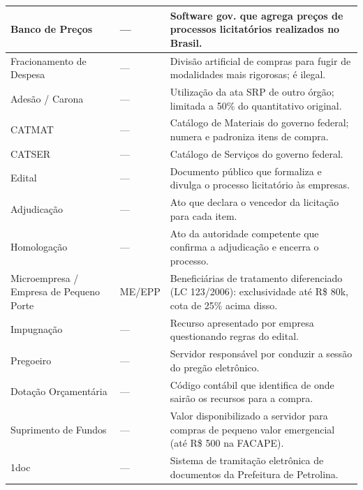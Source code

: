 \documentclass[a4paper,12pt]{article}
\begin{document}
\begin{longtable}{@{} p{4.5cm} p{1.8cm} p{8.5cm} @{}}
Banco de Preços & --- & Software gov. que agrega preços de processos licitatórios realizados no Brasil. \\ \midrule
Fracionamento de Despesa & --- & Divisão artificial de compras para fugir de modalidades mais rigorosas; é ilegal. \\ \midrule
Adesão / Carona & --- & Utilização da ata SRP de outro órgão; limitada a 50\% do quantitativo original. \\ \midrule
CATMAT & --- & Catálogo de Materiais do governo federal; numera e padroniza itens de compra. \\ \midrule
CATSER & --- & Catálogo de Serviços do governo federal. \\ \midrule
Edital & --- & Documento público que formaliza e divulga o processo licitatório às empresas. \\ \midrule
Adjudicação & --- & Ato que declara o vencedor da licitação para cada item. \\ \midrule
Homologação & --- & Ato da autoridade competente que confirma a adjudicação e encerra o processo. \\ \midrule
Microempresa / Empresa de Pequeno Porte & ME/EPP & Beneficiárias de tratamento diferenciado (LC 123/2006): exclusividade até R\$ 80k, cota de 25\% acima disso. \\ \midrule
Impugnação & --- & Recurso apresentado por empresa questionando regras do edital. \\ \midrule
Pregoeiro & --- & Servidor responsável por conduzir a sessão do pregão eletrônico. \\ \midrule
Dotação Orçamentária & --- & Código contábil que identifica de onde sairão os recursos para a compra. \\ \midrule
Suprimento de Fundos & --- & Valor disponibilizado a servidor para compras de pequeno valor emergencial (até R\$ 500 na FACAPE). \\ \midrule
1doc & --- & Sistema de tramitação eletrônica de documentos da Prefeitura de Petrolina. \\
\end{longtable}
\end{document}
